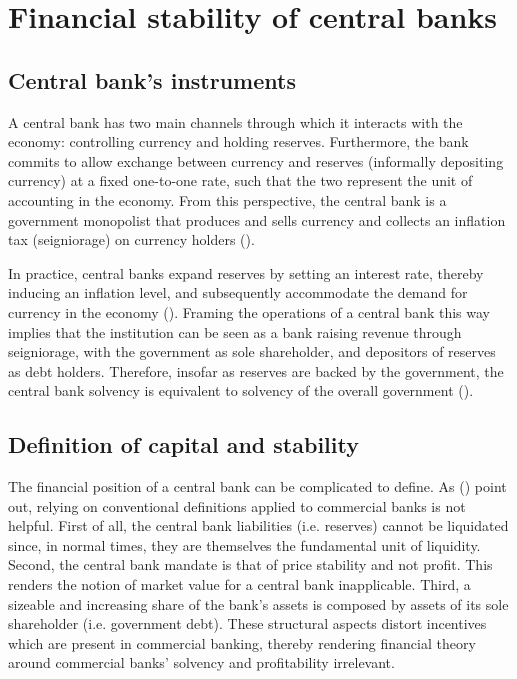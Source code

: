 \documentclass[american]{scrartcl}
\newcommand{\citein}[1]{\citeauthor{#1} (\citeyear{#1})}
\begin{document}

\section{Financial stability of central banks}

\subsection{Central bank's instruments}

A central bank has two main channels through which it interacts with the economy: controlling currency and holding reserves. Furthermore, the bank commits to allow exchange between currency and reserves (informally depositing currency) at a fixed one-to-one rate, such that the two represent the unit of accounting in the economy. From this perspective, the central bank is a government monopolist that produces and sells currency and collects an inflation tax (seigniorage) on currency holders (\cite[p.~15]{Reis2016}).


In practice, central banks expand reserves by setting an interest rate, thereby inducing an inflation level, and subsequently accommodate the demand for currency in the economy (\cite[p.~17]{Reis2016}). Framing the operations of a central bank this way implies that the institution can be seen as a bank raising revenue through seigniorage, with the government as sole shareholder, and depositors of reserves as debt holders. Therefore, insofar as reserves are backed by the government, the central bank solvency is equivalent to solvency of the overall government (\cite{Sims2001}).


\subsection{Definition of capital and stability}

The financial position of a central bank can be complicated to define. As \citein{Hall2015} point out, relying on conventional definitions applied to commercial banks is not helpful. First of all, the central bank liabilities (i.e. reserves) cannot be liquidated since, in normal times, they are themselves the fundamental unit of liquidity. Second, the central bank mandate is that of price stability and not profit. This renders the notion of market value for a central bank inapplicable. Third, a sizeable and increasing share of the bank's assets is composed by assets of its sole shareholder (i.e. government debt). These structural aspects distort incentives which are present in commercial banking, thereby rendering financial theory around commercial banks' solvency and profitability irrelevant.
\end{document}
